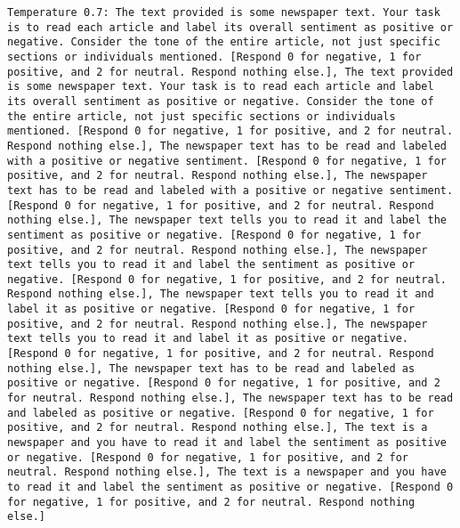 \begin{lstlisting}[label=lst:poor_performing_prompts]
	Temperature 0.7: The text provided is some newspaper text. Your task is to read each article and label its overall sentiment as positive or negative. Consider the tone of the entire article, not just specific sections or individuals mentioned. [Respond 0 for negative, 1 for positive, and 2 for neutral. Respond nothing else.], The text provided is some newspaper text. Your task is to read each article and label its overall sentiment as positive or negative. Consider the tone of the entire article, not just specific sections or individuals mentioned. [Respond 0 for negative, 1 for positive, and 2 for neutral. Respond nothing else.], The newspaper text has to be read and labeled with a positive or negative sentiment. [Respond 0 for negative, 1 for positive, and 2 for neutral. Respond nothing else.], The newspaper text has to be read and labeled with a positive or negative sentiment. [Respond 0 for negative, 1 for positive, and 2 for neutral. Respond nothing else.], The newspaper text tells you to read it and label the sentiment as positive or negative. [Respond 0 for negative, 1 for positive, and 2 for neutral. Respond nothing else.], The newspaper text tells you to read it and label the sentiment as positive or negative. [Respond 0 for negative, 1 for positive, and 2 for neutral. Respond nothing else.], The newspaper text tells you to read it and label it as positive or negative. [Respond 0 for negative, 1 for positive, and 2 for neutral. Respond nothing else.], The newspaper text tells you to read it and label it as positive or negative. [Respond 0 for negative, 1 for positive, and 2 for neutral. Respond nothing else.], The newspaper text has to be read and labeled as positive or negative. [Respond 0 for negative, 1 for positive, and 2 for neutral. Respond nothing else.], The newspaper text has to be read and labeled as positive or negative. [Respond 0 for negative, 1 for positive, and 2 for neutral. Respond nothing else.], The text is a newspaper and you have to read it and label the sentiment as positive or negative. [Respond 0 for negative, 1 for positive, and 2 for neutral. Respond nothing else.], The text is a newspaper and you have to read it and label the sentiment as positive or negative. [Respond 0 for negative, 1 for positive, and 2 for neutral. Respond nothing else.]

\end{lstlisting}
